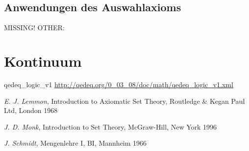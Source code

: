 \documentclass[a4paper,german,10pt,twoside]{book}
\theoremstyle{definition}
\theoremstyle{remark}
\begin{document}
\section{Anwendungen des Auswahlaxioms} \label{chapter6_section1} \hypertarget{chapter6_section1}{}
MISSING! OTHER: 



\chapter{Kontinuum} \label{chapter7} \hypertarget{chapter7}{}




\begin{thebibliography}{99}


 qedeq\_logic\_v1 \url{http://qedeq.org/0_03_08/doc/math/qedeq_logic_v1.xml}



 \emph{E. J. Lemmon}, Introduction to Axiomatic Set Theory, Routledge \& Kegan Paul Ltd, London 1968

 \emph{J. D. Monk}, Introduction to Set Theory, McGraw-Hill, New York 1996

 \emph{J. Schmidt}, Mengenlehre I, BI, Mannheim 1966

\end{thebibliography}
\backmatter

 \printindex
\end{document}

